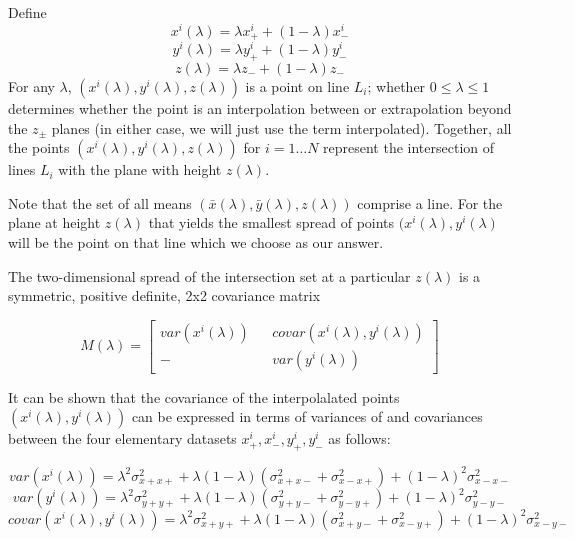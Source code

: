 \documentclass{amsart}
\begin{document}
Define
$$x^i(\lambda) = \lambda x^i_+ + (1-\lambda) x^i_-$$
$$y^i(\lambda) = \lambda y^i_+ + (1-\lambda) y^i_-$$
$$z(\lambda) = \lambda z_- + (1-\lambda) z_-$$ For any $\lambda$,
$(x^i(\lambda), y^i(\lambda), z(\lambda))$ is a point on line $L_i$;
whether $0\le\lambda\le 1$ determines whether the point is an
interpolation between or extrapolation beyond the $z_\pm$ planes (in
either case, we will just use the term interpolated). Together, all
the points $(x^i(\lambda), y^i(\lambda), z(\lambda))$ for $i=1\ldots
N$ represent the intersection of lines $L_i$ with the plane with
height $z(\lambda)$.

Note that the set of all means
$(\bar{x}(\lambda),\bar{y}(\lambda),z(\lambda))$ comprise a line. For
the plane at height $z(\lambda)$ that yields the smallest spread of
points $(x^i(\lambda),y^i(\lambda)$ will be the point on that line
which we choose as our answer.

The two-dimensional spread of the intersection set at a particular
$z(\lambda)$ is a symmetric, positive definite, 2x2
covariance matrix

\[M(\lambda) =
\begin{bmatrix}
 var(x^i(\lambda)) && covar(x^i(\lambda),y^i(\lambda)) \\
  -                && var(y^i(\lambda))
\end{bmatrix}
\]

It can be shown that the covariance of the interpolalated points
$(x^i(\lambda),y^i(\lambda))$ can be expressed in terms of variances of and covariances between the four elementary datasets $x^i_+, x^i_-, y^i_+, y^i_-$ as follows:

\begin{equation}\label{varx}
var(x^i(\lambda)) = \lambda^2\sigma^2_{x+x+} + \lambda(1-\lambda)(\sigma^2_{x+x-} + \sigma^2_{x-x+}) 
                + (1-\lambda)^2\sigma^2_{x-x-}
\end{equation}
\begin{equation}\label{vary}
var(y^i(\lambda)) = \lambda^2\sigma^2_{y+y+} + \lambda(1-\lambda)(\sigma^2_{y+y-} + \sigma^2_{y-y+}) 
                + (1-\lambda)^2\sigma^2_{y-y-}\end{equation}
\begin{equation}\label{covarxy}
covar(x^i(\lambda),y^i(\lambda)) = \lambda^2\sigma^2_{x+y+}  
                        + \lambda(1-\lambda)(\sigma^2_{x+y-} + \sigma^2_{x-y+}) 
                              + (1-\lambda)^2\sigma^2_{x-y-}
\end{equation}
\end{document}
